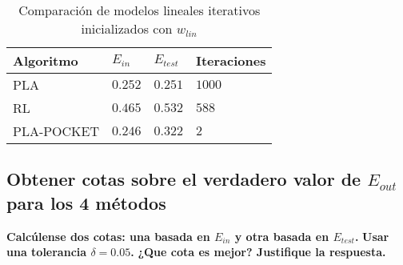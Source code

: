 \begin{table}[H]
    \centering
    \begin{tabular}{llll} \toprule
        Algoritmo & $E_{in}$ & $E_{test}$ & Iteraciones \\ \midrule
        PLA & $0.252$ & $0.251$ & $1000$ \\
        RL & $0.465$ & $0.532$ & $588$ \\
        PLA-POCKET & $0.246$ & $0.322$ & $2$ \\ \bottomrule
    \end{tabular}
    \caption{Comparación de modelos lineales iterativos inicializados con $w_{lin}$}
\end{table}

\subsection{Obtener cotas sobre el verdadero valor de $E_{out}$ para los 4 métodos}

\textbf{Calcúlense dos cotas: una basada en $E_{in}$ y otra basada en $E_{test}$.}
\textbf{Usar una tolerancia $\delta=0.05$.}
\textbf{¿Que cota es mejor? Justifique la respuesta.}

